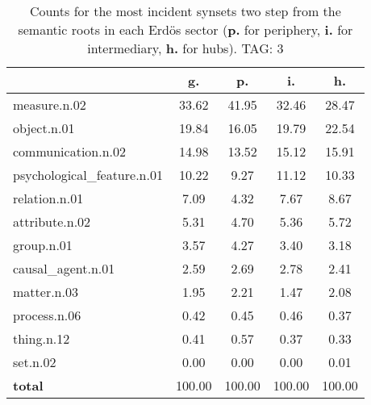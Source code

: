 \begin{table}[h!]
\begin{center}
\begin{tabular}{| l | c | c | c | c |}\hline
 & g. & p. & i. & h. \\\hline
measure.n.02 & 33.62  & 41.95  & 32.46  & 28.47 \\\hline
object.n.01 & 19.84  & 16.05  & 19.79  & 22.54 \\\hline
communication.n.02 & 14.98  & 13.52  & 15.12  & 15.91 \\\hline
psychological\_feature.n.01 & 10.22  & 9.27  & 11.12  & 10.33 \\\hline
relation.n.01 & 7.09  & 4.32  & 7.67  & 8.67 \\\hline
attribute.n.02 & 5.31  & 4.70  & 5.36  & 5.72 \\\hline
group.n.01 & 3.57  & 4.27  & 3.40  & 3.18 \\\hline
causal\_agent.n.01 & 2.59  & 2.69  & 2.78  & 2.41 \\\hline
matter.n.03 & 1.95  & 2.21  & 1.47  & 2.08 \\\hline
process.n.06 & 0.42  & 0.45  & 0.46  & 0.37 \\\hline
thing.n.12 & 0.41  & 0.57  & 0.37  & 0.33 \\\hline
set.n.02 & 0.00  & 0.00  & 0.00  & 0.01 \\\hline
{{\bf total}} & 100.00  & 100.00  & 100.00  & 100.00 \\\hline
\end{tabular}
\caption{Counts for the most incident synsets two step from the semantic roots in each Erd\"os sector ({\bf p.} for periphery, {\bf i.} for intermediary, {\bf h.} for hubs). TAG: 3}
\end{center}
\end{table}